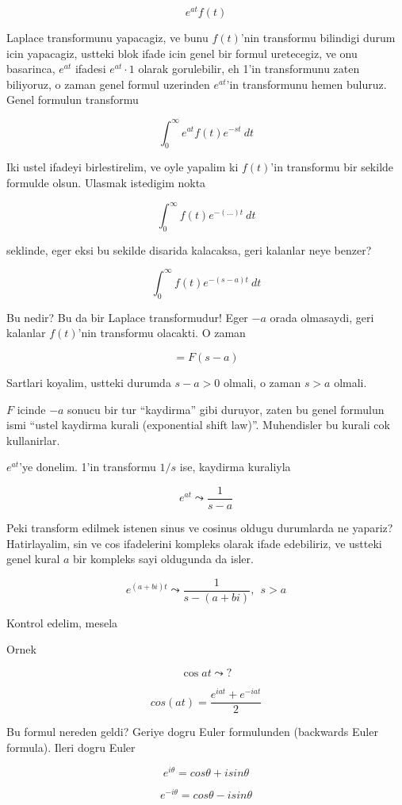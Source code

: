 \documentclass[12pt,fleqn]{article}\usepackage{../common}
\begin{document}
\[ e^{at}f(t) \]

Laplace transformunu yapacagiz, ve bunu $f(t)$'nin transformu bilindigi
durum icin yapacagiz, ustteki blok ifade icin genel bir formul uretecegiz,
ve onu basarinca, $e^{at}$ ifadesi $e^{at} \cdot 1$ olarak gorulebilir, eh
1'in transformunu zaten biliyoruz, o zaman genel formul uzerinden $e^{at}$'in
transformunu hemen buluruz. Genel formulun transformu

\[ \int_0^{\infty} e^{at} f(t)e^{-st} \ dt \]

Iki ustel ifadeyi birlestirelim, ve oyle yapalim ki $f(t)$'in transformu
bir sekilde formulde olsun. Ulasmak istedigim nokta 

\[ \int_0^{\infty} f(t)e^{-( ... )t } \ dt \]

seklinde, eger eksi bu sekilde disarida kalacaksa, geri kalanlar neye
benzer? 

\[ \int_0^{\infty} f(t)e^{-(s-a)t } \ dt \]

Bu nedir? Bu da bir Laplace transformudur! Eger $-a$ orada olmasaydi, geri
kalanlar $f(t)$'nin transformu olacakti. O zaman 

\[ = F(s-a) \]

Sartlari koyalim, ustteki durumda $s-a > 0$ olmali, o zaman $s > a$
olmali. 

$F$ icinde $-a$ sonucu bir tur ``kaydirma'' gibi duruyor, zaten bu genel
formulun ismi ``ustel kaydirma kurali (exponential shift
law)''. Muhendisler bu kurali cok kullanirlar. 

$e^{at}$'ye donelim. 1'in transformu $1/s$ ise, kaydirma kuraliyla

\[ e^{at} \leadsto \frac{1}{s-a} \]

Peki transform edilmek istenen sinus ve cosinus oldugu durumlarda ne
yapariz? Hatirlayalim, sin ve cos ifadelerini kompleks olarak ifade
edebiliriz, ve ustteki genel kural $a$ bir kompleks sayi oldugunda da
isler. 

\[ e^{(a+bi)t} \leadsto \frac{1}{s - (a+bi)}, \ \ s>a  \]

Kontrol edelim, mesela 

Ornek

\[ \cos at \leadsto ? \]

\[ cos (at) = \frac{e^{iat} + e^{-iat} }{2} \]

Bu formul nereden geldi? Geriye dogru Euler formulunden (backwards Euler
formula). Ileri dogru Euler

\[ e^{i\theta} = cos\theta + isin\theta \]

\[ e^{-i\theta} = cos\theta - isin\theta \]
\end{document}
